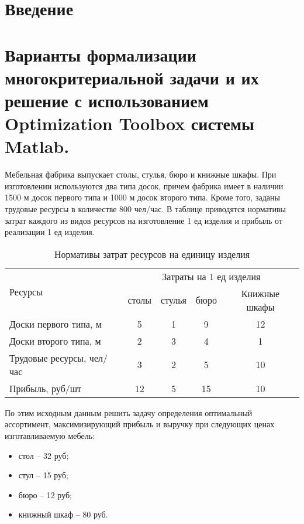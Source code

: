 \documentclass[a4paper, 12pt]{article}		%
\begin{document}

\tableofcontents

%
\newpage
\section*{Введение}


\newpage
\section{Варианты формализации многокритериальной задачи и их решение с использованием Optimization Toolbox  системы Matlab.}

Мебельная  фабрика выпускает столы, стулья, бюро и книжные шкафы. При изготовлении используются два типа досок, причем фабрика имеет в наличии 1500 м досок первого типа и 1000 м досок второго типа. Кроме того, заданы трудовые ресурсы в количестве 800 чел/час. В таблице приводятся нормативы затрат каждого из видов ресурсов на изготовление 1 ед изделия и прибыль от реализации 1  ед  изделия.

\begin{table}[htb]
	\begin{tabularx}{\textwidth}{|X|c|c|c|c|}
	\hline 
	\multirow{2}{*}{Ресурсы} & \multicolumn{4}{c|}{Затраты на 1 ед изделия} \\ 
	\hhline{~----}
	{} & столы & стулья & бюро & Книжные шкафы \\ 
	\hline 
	Доски первого типа, м & 5 & 1 & 9 & 12 \\ 
	\hline 
	Доски второго типа, м & 2 & 3 & 4 & 1 \\ 
	\hline 
	Трудовые ресурсы, чел/час & 3 & 2 & 5 & 10 \\ 
	\hline 
	Прибыль, руб/шт & 12 & 5 & 15 & 10 \\ 
	\hline 
	\end{tabularx} 
\caption{Нормативы затрат ресурсов на единицу изделия}
\end{table}

По этим исходным данным решить задачу определения оптимальный ассортимент, максимизирующий прибыль и выручку при следующих ценах изготавливаемую мебель:

\begin{itemize}
\item стол -- 32 руб;
\item стул -- 15 руб;
\item бюро -- 12 руб;
\item книжный шкаф -- 80 руб.
\end{itemize}
\end{document}
